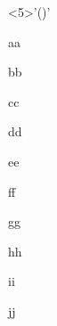 \begin{edaenumerate}<5>'()'
  \item aa
  \item bb
  \item cc
  \item dd
  \item ee
  \item ff
  \item gg
  \item hh
  \item ii
  \item jj
\end{edaenumerate}
